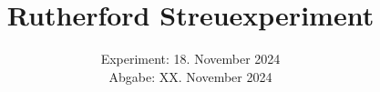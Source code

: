 

\publishers{TU Dortmund – Department of Physics}

\subject{\texorpdfstring{\vspace{2ex}}{}V16\texorpdfstring{\vspace{-2ex}}{}} %
\title{Rutherford Streuexperiment} %
\date{
	Experiment: 18. November 2024 %
	\\ Abgabe: XX. November 2024 %
}




\maketitle
\thispagestyle{empty}

\tableofcontents
\newpage








\printbibliography{}

\newpage



